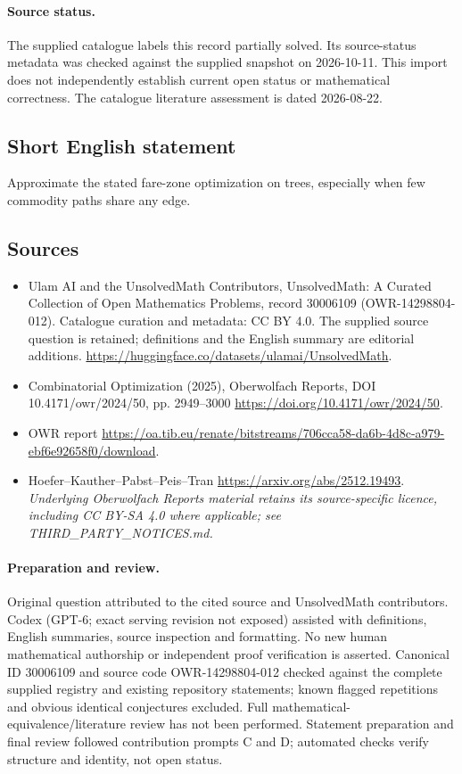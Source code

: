 \documentclass[11pt]{article}
\begin{document}
\paragraph{Source status.}
The supplied catalogue labels this record partially solved. Its source-status metadata was checked against the supplied snapshot on 2026-10-11. This import does not independently establish current open status or mathematical correctness. The catalogue literature assessment is dated 2026-08-22.
\subsection{Short English statement}
Approximate the stated fare-zone optimization on trees, especially when few commodity paths share any edge.
\subsection{Sources}
\begin{itemize}
\item[S1] Ulam AI and the UnsolvedMath Contributors, UnsolvedMath: A Curated Collection of Open Mathematics Problems, record 30006109 (OWR-14298804-012). Catalogue curation and metadata: CC BY 4.0. The supplied source question is retained; definitions and the English summary are editorial additions.
\url{https://huggingface.co/datasets/ulamai/UnsolvedMath}.
\item[S2] Combinatorial Optimization (2025), Oberwolfach Reports, DOI 10.4171/owr/2024/50, pp. 2949--3000
\url{https://doi.org/10.4171/owr/2024/50}.
\item[S3] OWR report
\url{https://oa.tib.eu/renate/bitstreams/706cca58-da6b-4d8c-a979-ebf6e92658f0/download}.
\item[S4] Hoefer--Kauther--Pabst--Peis--Tran
\url{https://arxiv.org/abs/2512.19493}.
\textit{Underlying Oberwolfach Reports material retains its source-specific licence, including CC BY-SA 4.0 where applicable; see THIRD\_PARTY\_NOTICES.md.}
\end{itemize}
\paragraph{Preparation and review.}
Original question attributed to the cited source and UnsolvedMath contributors. Codex (GPT-6; exact serving revision not exposed) assisted with definitions, English summaries, source inspection and formatting. No new human mathematical authorship or independent proof verification is asserted. Canonical ID 30006109 and source code OWR-14298804-012 checked against the complete supplied registry and existing repository statements; known flagged repetitions and obvious identical conjectures excluded. Full mathematical-equivalence/literature review has not been performed. Statement preparation and final review followed contribution prompts C and D; automated checks verify structure and identity, not open status.
\label{end:30006109}
\end{document}

